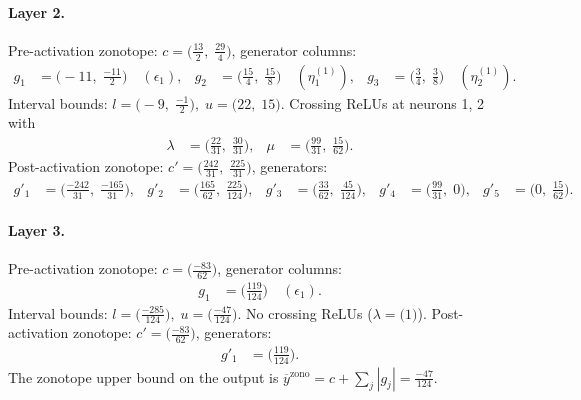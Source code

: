 \documentclass[11pt]{article}
\begin{document}
\paragraph{Layer 2.}
Pre-activation zonotope: $c = \bigl(\frac{13}{2},\; \frac{29}{4}\bigr)$, generator columns:
\begin{align*}
g_{1} &= \bigl(-11,\; \frac{-11}{2}\bigr) \quad (\epsilon_{1}), &
g_{2} &= \bigl(\frac{15}{4},\; \frac{15}{8}\bigr) \quad (\eta^{(1)}_{1}), &
g_{3} &= \bigl(\frac{3}{4},\; \frac{3}{8}\bigr) \quad (\eta^{(1)}_{2}).
\end{align*}
Interval bounds: $l = \bigl(-9,\; \frac{-1}{2}\bigr), \; u = \bigl(22,\; 15\bigr)$. 
Crossing ReLUs at neurons 1, 2 with
\begin{align*}
\lambda &= \bigl(\frac{22}{31},\; \frac{30}{31}\bigr), & \mu &= \bigl(\frac{99}{31},\; \frac{15}{62}\bigr).
\end{align*}
Post-activation zonotope: $c' = \bigl(\frac{242}{31},\; \frac{225}{31}\bigr)$, generators:
\begin{align*}
g'_{1} &= \bigl(\frac{-242}{31},\; \frac{-165}{31}\bigr), &
g'_{2} &= \bigl(\frac{165}{62},\; \frac{225}{124}\bigr), &
g'_{3} &= \bigl(\frac{33}{62},\; \frac{45}{124}\bigr), &
g'_{4} &= \bigl(\frac{99}{31},\; 0\bigr), &
g'_{5} &= \bigl(0,\; \frac{15}{62}\bigr).
\end{align*}
\paragraph{Layer 3.}
Pre-activation zonotope: $c = \bigl(\frac{-83}{62}\bigr)$, generator columns:
\begin{align*}
g_{1} &= \bigl(\frac{119}{124}\bigr) \quad (\epsilon_{1}).
\end{align*}
Interval bounds: $l = \bigl(\frac{-285}{124}\bigr), \; u = \bigl(\frac{-47}{124}\bigr)$. 
No crossing ReLUs ($\lambda = \bigl(1\bigr)$).
Post-activation zonotope: $c' = \bigl(\frac{-83}{62}\bigr)$, generators:
\begin{align*}
g'_{1} &= \bigl(\frac{119}{124}\bigr).
\end{align*}
The zonotope upper bound on the output is $\overline{y}^{\text{zono}} = c + \sum_j |g_j| = \frac{-47}{124}$.
\end{document}
